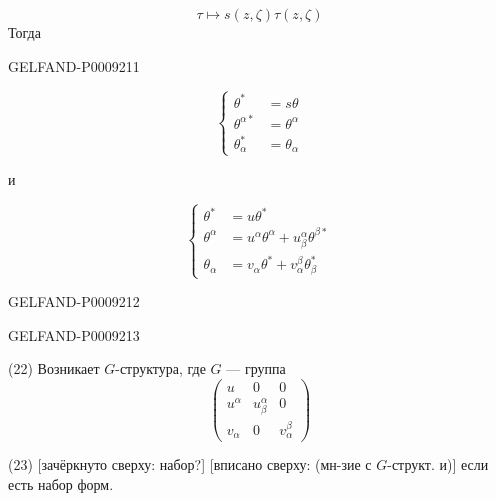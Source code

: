 \begin{equation*}
 \tau\mapsto s(z,\zeta)\tau(z,\zeta)
 \tag{19}
\end{equation*}
Тогда


\begin{GelfandAdjacentEvidence}{GELFAND-P000921}{1}

\begin{equation*}
 \left\{\begin{aligned}
 \theta^*&=s\theta\\
 \theta^{\alpha*}&=\theta^\alpha\\
 \theta_\alpha^*&=\theta_\alpha
 \end{aligned}\right.
 \tag{20}
\end{equation*}

и

\begin{equation*}
 \left\{\begin{aligned}
 \theta^*&=u\theta^*\\
 \theta^\alpha&=u^\alpha\theta^\alpha+u^\alpha_\beta\theta^{\beta*}\\
 \theta_\alpha&=v_\alpha\theta^*+v^\beta_\alpha\theta_\beta^*
 \end{aligned}\right.
 \tag{21}
\end{equation*}
\end{GelfandAdjacentEvidence}
\begin{GelfandAdjacentEvidence}{GELFAND-P000921}{2}

\end{GelfandAdjacentEvidence}
\begin{GelfandAdjacentEvidence}{GELFAND-P000921}{3}


(22) Возникает $G$-структура, где $G$ --- группа
\begin{equation*}
 \begin{pmatrix}
 u&0&0\\
 u^\alpha&u_\beta^\alpha&0\\
 v_\alpha&0&v_\alpha^\beta
 \end{pmatrix}
\end{equation*}

(23) 
[зачёркнуто сверху: набор?]
[вписано сверху: (мн-зие с $G$-структ. и)]
если есть набор форм.
\end{GelfandAdjacentEvidence}
